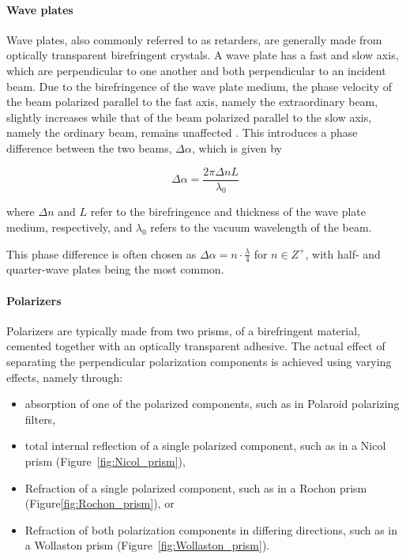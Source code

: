 \paragraph{Wave plates}
Wave plates, also commonly referred to as retarders, are generally made from optically transparent birefringent crystals. A wave plate has a fast and slow axis, which are perpendicular to one another and both perpendicular to an incident beam. Due to the birefringence of the wave plate medium, the phase velocity of the beam polarized parallel to the fast axis, namely the extraordinary beam, slightly increases while that of the beam polarized parallel to the slow axis, namely the ordinary beam, remains unaffected \citep{Hecht_optics}. This introduces a phase difference between the two beams, $\Delta \alpha$, which is given by

\begin{equation}
    \Delta \alpha = \frac{2 \pi \Delta n L}{\lambda_{0}}
\end{equation}

\noindent where $\Delta n$ and $L$ refer to the birefringence and thickness of the wave plate medium, respectively, and $\lambda_{0}$ refers to the vacuum wavelength of the beam.
\prgph

This phase difference is often chosen as $\Delta \alpha = n \cdot \frac{\lambda}{4}$ for $n \in Z^{+}$, with half- and quarter-wave plates being the most common.
\prgph
{}


\paragraph{Polarizers}
Polarizers are typically made from two prisms, of a birefringent material, cemented together with an optically transparent adhesive. The actual effect of separating the perpendicular polarization components is achieved using varying effects, namely through:
\begin{itemize}
    \item absorption of one of the polarized components, such as in Polaroid polarizing filters,
    \item total internal reflection of a single polarized component, such as in a Nicol prism (Figure~\ref{fig:Nicol_prism}),
    \item Refraction of a single polarized component, such as in a Rochon prism (Figure\ref{fig:Rochon_prism}), or
    \item Refraction of both polarization components in differing directions, such as in a Wollaston prism (Figure~\ref{fig:Wollaston_prism}).
\end{itemize}

